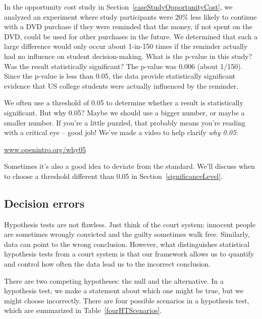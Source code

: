 \begin{example}{In the opportunity cost study in Section~\ref{caseStudyOpportunityCost}, we analyzed an experiment where study participants were 20\% less likely to continue with a DVD purchase if they were reminded that the money, if not spent on the DVD, could be used for other purchases in the future. We determined that such a large difference would only occur about 1-in-150 times if the reminder actually had no influence on student decision-making. What is the p-value in this study? Was the result statistically significant?}
The p-value was 0.006 (about 1/150). Since the p-value is less than 0.05, the data provide statistically significant evidence that US college students were actually influenced by the reminder.
\end{example}

\begin{termBox}{
We often use a threshold of 0.05 to determine whether a result is statistically significant. But why 0.05? Maybe we should use a bigger number, or maybe a smaller number. If you're a little puzzled, that probably means you're reading with a critical eye -- good job! We've made a video to help clarify \emph{why 0.05}:
\begin{center}
\href{http://www.openintro.org/why05}{www.openintro.org/why05}
\end{center}
Sometimes it's also a good idea to deviate from the standard. We'll discuss when to choose a threshold different than 0.05 in Section~\ref{significanceLevel}.\vspace{0.5mm}}
\end{termBox}


\textA{\pagebreak}

\subsection{Decision errors}


Hypothesis tests are not flawless. Just think of the court system: innocent people are sometimes wrongly convicted and the guilty sometimes walk free. Similarly, data can point to the wrong conclusion. However, what distinguishes statistical hypothesis tests from a court system is that our framework allows us to quantify and control how often the data lead us to the incorrect conclusion.

There are two competing hypotheses: the null and the alternative. In a hypothesis test, we make a statement about which one might be true, but we might choose incorrectly. There are four possible scenarios in a hypothesis test, which are summarized in Table~\ref{fourHTScenarios}.


